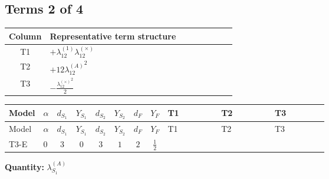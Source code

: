 \documentclass[8pt]{article}
\begin{document}
\begin{landscape}
\subsection*{Terms 2 of 4}
\begin{center}
\begin{tabular}{@{}c >{\raggedright\arraybackslash}p{0.82\linewidth}@{}}
\toprule
Column & Representative term structure \\
\midrule
T1 & \(\displaystyle +{\lambda_{12}^{(1)}} {\lambda_{12}^{(\times)}}\) \\
\midrule
T2 & \(\displaystyle +12 {\lambda_{12}^{(A)}}^2\) \\
\midrule
T3 & \(\displaystyle -\frac{{\lambda_{12}^{(\times)}}^2}{2}\) \\
\midrule
\bottomrule
\end{tabular}
\end{center}
\smallskip
\tiny
\begin{longtable}{@{}llcccccc >{\raggedright\arraybackslash}p{0.21\linewidth} >{\raggedright\arraybackslash}p{0.21\linewidth} >{\raggedright\arraybackslash}p{0.21\linewidth}@{}}
\toprule
Model & $\alpha$ & $d_{S_1}$ & $Y_{S_1}$ & $d_{S_2}$ & $Y_{S_2}$ & $d_F$ & $Y_F$ & T1 & T2 & T3 \\
\midrule
\endfirsthead
\toprule
Model & $\alpha$ & $d_{S_1}$ & $Y_{S_1}$ & $d_{S_2}$ & $Y_{S_2}$ & $d_F$ & $Y_F$ & T1 & T2 & T3 \\
\midrule
\endhead
T3-E & $0$ & $3$ & $0$ & $3$ & $1$ & $2$ & $\frac{1}{2}$ & \scriptsize\adjustbox{max width=\linewidth}{$\begin{gathered} +{\lambda_{12}^{(1)}} {\lambda_{12}^{(\times)}}\end{gathered}$} & \scriptsize\adjustbox{max width=\linewidth}{$\begin{gathered} +12 {\lambda_{12}^{(A)}}^2\end{gathered}$} & \scriptsize\adjustbox{max width=\linewidth}{$\begin{gathered} -\frac{{\lambda_{12}^{(\times)}}^2}{2}\end{gathered}$} \\
\midrule
\bottomrule
\end{longtable}
\clearpage
\noindent\textbf{Quantity: }$\lambda_{S_1}^{(A)}$\par\smallskip

\end{landscape}
\end{document}
